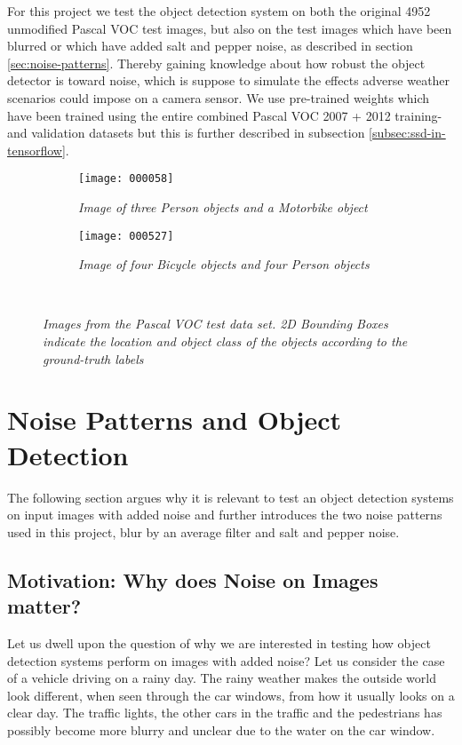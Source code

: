 \documentclass{article}
\begin{document}
For this project we test the object detection system on both the original 4952 unmodified Pascal VOC test images, but also on the test images which have been blurred or which have added salt and pepper noise, as described in section \ref{sec:noise-patterns}. Thereby gaining knowledge about how robust the object detector is toward noise, which is suppose to simulate the effects adverse weather scenarios could impose on a camera sensor. We use pre-trained weights which have been trained using the entire combined Pascal VOC 2007 + 2012 training- and validation datasets but this is further described in subsection \ref{subsec:ssd-in-tensorflow}.

\begin{figure}
\begin{subfigure}{.5\linewidth}
\captionsetup{width=.9\linewidth}
\centering
\texttt{[image: 000058]}
\caption{\textit{Image of three Person objects and a Motorbike object}}
\label{fig:pascal-voc-1.1}
\end{subfigure}%
\begin{subfigure}{.5\linewidth}
\captionsetup{width=.9\linewidth}
\centering
\texttt{[image: 000527]}
\caption{\textit{Image of four Bicycle objects and four Person objects}}
\label{fig:pascal-voc-1.2}
\end{subfigure}\\[1ex]
\caption{\textit{Images from the Pascal VOC test data set. 2D Bounding Boxes indicate the location and object class of the objects according to the ground-truth labels}}
\label{fig:pascal-voc-1}
\end{figure}

\section{Noise Patterns and Object Detection}
The following section argues why it is relevant to test an object detection systems on input images with added noise and further introduces the two noise patterns used in this project, blur by an average filter and salt and pepper noise.

\subsection{Motivation: Why does Noise on Images matter?}
Let us dwell upon the question of why we are interested in testing how object detection systems perform on images with added noise? Let us consider the case of a vehicle driving on a rainy day. The rainy weather makes the outside world look different, when seen through the car windows, from how it usually looks on a clear day. The traffic lights, the other cars in the traffic and the pedestrians has possibly become more blurry and unclear due to the water on the car window. 
\end{document}
